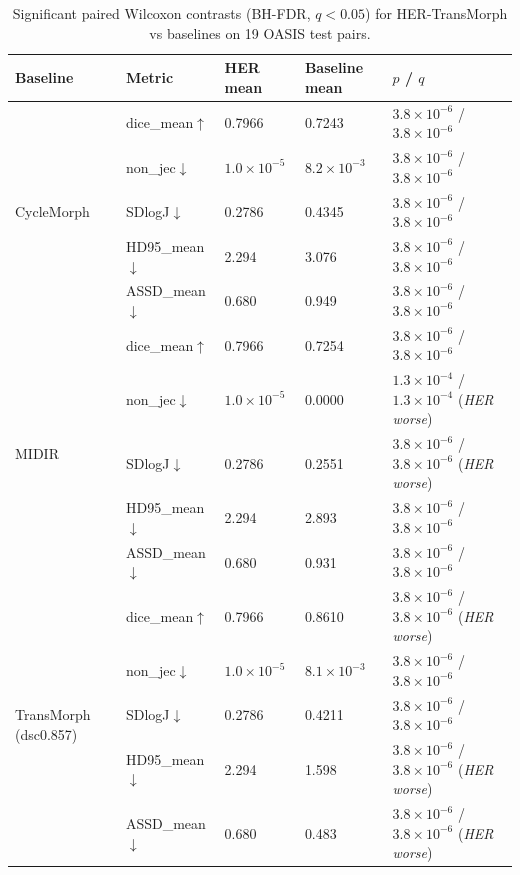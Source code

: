 \documentclass[11pt,a4paper]{article}
\begin{document}
\begin{table}[H]
\caption{Significant paired Wilcoxon contrasts (BH-FDR, $q<0.05$) for HER-TransMorph vs baselines on 19 OASIS test pairs.\label{tab:s5_oasis_wilcoxon}}
\centering
\scriptsize
\setlength{\tabcolsep}{4pt}
\begin{tabularx}{\textwidth}{llXXX}
\toprule
\textbf{Baseline} & \textbf{Metric} & \textbf{HER mean} & \textbf{Baseline mean} & \textbf{$p$ / $q$} \\
\midrule
\multirow{5}{*}{CycleMorph} & dice\_mean\(\uparrow\) & 0.7966 & 0.7243 & $3.8\times10^{-6}$ / $3.8\times10^{-6}$ \\
 & non\_jec\(\downarrow\) & $1.0\times10^{-5}$ & $8.2\times10^{-3}$ & $3.8\times10^{-6}$ / $3.8\times10^{-6}$ \\
 & SDlogJ\(\downarrow\) & 0.2786 & 0.4345 & $3.8\times10^{-6}$ / $3.8\times10^{-6}$ \\
 & HD95\_mean\(\downarrow\) & 2.294 & 3.076 & $3.8\times10^{-6}$ / $3.8\times10^{-6}$ \\
 & ASSD\_mean\(\downarrow\) & 0.680 & 0.949 & $3.8\times10^{-6}$ / $3.8\times10^{-6}$ \\
\midrule
\multirow{5}{*}{MIDIR} & dice\_mean\(\uparrow\) & 0.7966 & 0.7254 & $3.8\times10^{-6}$ / $3.8\times10^{-6}$ \\
 & non\_jec\(\downarrow\) & $1.0\times10^{-5}$ & 0.0000 & $1.3\times10^{-4}$ / $1.3\times10^{-4}$ (\emph{HER worse}) \\
 & SDlogJ\(\downarrow\) & 0.2786 & 0.2551 & $3.8\times10^{-6}$ / $3.8\times10^{-6}$ (\emph{HER worse}) \\
 & HD95\_mean\(\downarrow\) & 2.294 & 2.893 & $3.8\times10^{-6}$ / $3.8\times10^{-6}$ \\
 & ASSD\_mean\(\downarrow\) & 0.680 & 0.931 & $3.8\times10^{-6}$ / $3.8\times10^{-6}$ \\
\midrule
\multirow{5}{*}{TransMorph (dsc0.857)} & dice\_mean\(\uparrow\) & 0.7966 & 0.8610 & $3.8\times10^{-6}$ / $3.8\times10^{-6}$ (\emph{HER worse}) \\
 & non\_jec\(\downarrow\) & $1.0\times10^{-5}$ & $8.1\times10^{-3}$ & $3.8\times10^{-6}$ / $3.8\times10^{-6}$ \\
 & SDlogJ\(\downarrow\) & 0.2786 & 0.4211 & $3.8\times10^{-6}$ / $3.8\times10^{-6}$ \\
 & HD95\_mean\(\downarrow\) & 2.294 & 1.598 & $3.8\times10^{-6}$ / $3.8\times10^{-6}$ (\emph{HER worse}) \\
 & ASSD\_mean\(\downarrow\) & 0.680 & 0.483 & $3.8\times10^{-6}$ / $3.8\times10^{-6}$ (\emph{HER worse}) \\

\end{tabularx}
\end{table}
\end{document}

